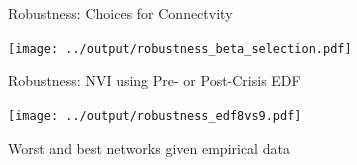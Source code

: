 \documentclass[12pt,envcountsect, leqno,xcolor=dvipsnames]{beamer}
\begin{document}
\begin{frame}{Robustness: Choices for Connectvity} 
\vspace{-0.2in}
\begin{center}
\texttt{[image: ../output/robustness\_beta\_selection.pdf]} 
\end{center}

\end{frame}

\begin{frame}{Robustness: NVI using Pre- or Post-Crisis EDF}

\begin{center}
\texttt{[image: ../output/robustness\_edf8vs9.pdf]} 
\end{center}

\end{frame}


\begin{frame}

{\Large Worst and best networks given empirical data}

\end{frame}
\end{document}
